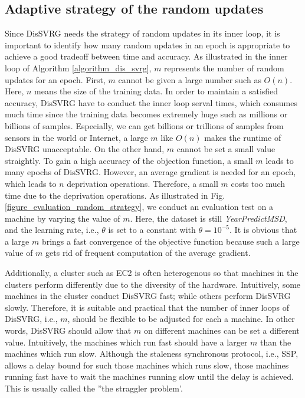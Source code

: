 \documentclass[10pt,journal,finalsubmission,compsoc]{IEEEtran}
\begin{document}
\subsection{Adaptive strategy of the random updates}

Since DisSVRG needs the strategy of random updates in its inner loop, it is important to identify how many random updates in an epoch is appropriate to achieve a good tradeoff between time and accuracy.  As illustrated in the inner loop of Algorithm \ref{algorithm_dis_svrg}, $m$ represents the number of random updates for an epoch. First, $m$ cannot be given a large number such as $O(n)$. Here, $n$ means the size of the training data.  In order to maintain a satisfied accuracy, DisSVRG have to conduct the inner loop serval times, which consumes much time since the training data becomes extremely huge such as millions or billions of samples. Especially, we can get billions or trillions of samples from sensors in the world or Internet, a large $m$ like $O(n)$ makes the runtime of DisSVRG unacceptable.  On the other hand, $m$ cannot be set a small value straightly.    To gain a high accuracy of the objection function, a small $m$ leads to many epochs of DisSVRG. However, an average gradient is needed for  an epoch, which leads to $n$ deprivation operations. Therefore, a small $m$ costs too much time due to the deprivation operations. As illustrated in Fig. \ref{figure_evaluation_random_strategy}, we conduct an evaluation test on a  machine by varying the value of $m$. Here, the dataset is still \emph{YearPredictMSD}, and the learning rate, i.e., $\theta$ is set to a constant with $\theta=10^{-5}$. It is obvious that a large $m$ brings a fast convergence of the objective function because such a large value of $m$ gets rid of frequent computation of the average gradient.

Additionally, a cluster such as EC2 is often heterogenous so that machines in the clusters perform differently due to the diversity of the hardware. Intuitively, some machines in the cluster conduct DisSVRG  fast; while others perform DisSVRG slowly.  Therefore, it is suitable and practical that the number of inner loops of DisSVRG, i.e., $m$, should be flexible to be adjusted for each a machine. In other words, DisSVRG should allow that $m$ on different machines can be set a different value. Intuitively, the machines which run fast should have a larger $m$ than the machines which run slow. Although the staleness synchronous protocol, i.e., SSP, allows a delay bound for such those machines which runs slow, those machines running fast have to wait the machines running slow until the delay is achieved.  This is usually called the ''the straggler problem'.  
\end{document}
